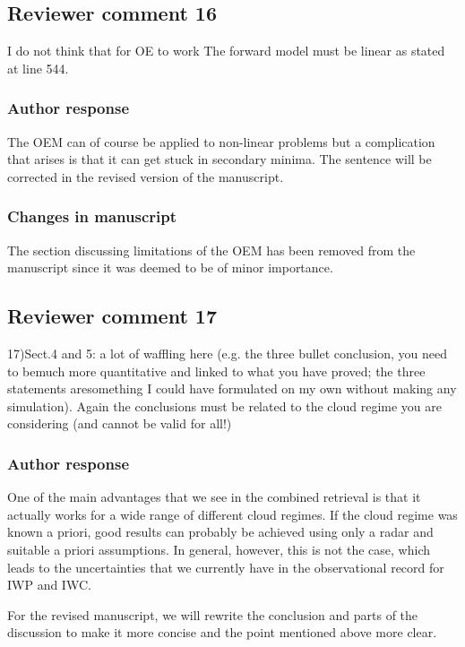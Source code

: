 \subsection*{Reviewer comment 16}

I do not think that for OE to work The forward model must be linear as stated at line 544.

\subsubsection*{Author response}

The OEM can of course be applied to non-linear problems but a complication that
arises is that it can get stuck in secondary minima. The sentence will be
corrected in the revised version of the manuscript.

\subsubsection*{Changes in manuscript}

The section discussing limitations of the OEM has been removed from the manuscript
since it was deemed to be of minor importance.

\subsection*{Reviewer comment 17}

17)Sect.4 and 5: a lot of waffling here (e.g. the three bullet conclusion, you
need to bemuch more quantitative and linked to what you have proved; the three
statements aresomething I could have formulated on my own without making any
simulation). Again the conclusions must be related to the cloud regime you are
considering (and cannot be valid for all!)

\subsubsection*{Author response}

One of the main advantages that we see in the combined retrieval is that it
actually works for a wide range of different cloud regimes. If the cloud regime
was known a priori, good results can probably be achieved using only a radar and
suitable a priori assumptions. In general, however, this is not the case, which
leads to the uncertainties that we currently have in the observational record
for IWP and IWC.

For the revised manuscript, we will rewrite the conclusion and parts of the discussion to make
it more concise and the point mentioned above more clear.

